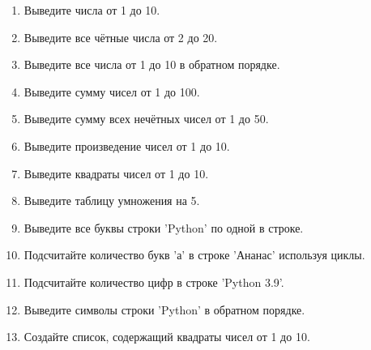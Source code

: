 \documentclass[a4,12pt]{article}
\theoremstyle{remark}
\begin{document}
\begin{enumerate}
    \subsection*{Начальный уровень}%
    \item Выведите числа от 1 до 10.
    \item Выведите все чётные числа от 2 до 20.
    \item Выведите все числа от 1 до 10 в обратном порядке.
    \item Выведите сумму чисел от 1 до 100.
    \item Выведите сумму всех нечётных чисел от 1 до 50.
    \item Выведите произведение чисел от 1 до 10.
    \item Выведите квадраты чисел от 1 до 10.
    \item Выведите таблицу умножения на 5.
    \item Выведите все буквы строки 'Python' по одной в строке.
    \item Подсчитайте количество букв 'а' в строке 'Ананас' используя циклы.
    \item Подсчитайте количество цифр в строке 'Python 3.9'.
    \item Выведите символы строки 'Python' в обратном порядке.
    \item Создайте список, содержащий квадраты чисел от 1 до 10.
    

\end{enumerate}
\end{document}
